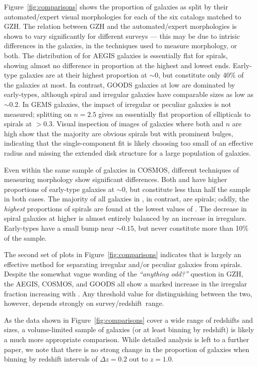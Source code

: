 \documentclass[twocolumn]{aastex6}
\begin{document}
Figure~\ref{fig:comparisons} shows the proportion of galaxies as split by their automated/expert visual morphologies for each of the six catalogs matched to GZH. The relation between GZH and the automated/expert morphologies is shown to vary significantly for different surveys --- this may be due to intrisic differences in the galaxies, in the techniques used to measure morphology, or both. The distribution of \pbest{} for AEGIS galaxies is essentially flat for spirals, showing almost no difference in proportion at the highest and lowest ends. Early-type galaxies are at their highest proportion at \pbest$\sim0$, but constitute only 40\% of the galaxies at most. In contrast, GOODS galaxies at low \pbest{} are dominated by early-types, although spiral and irregular galaxies have comparable sizes as low as \pbest$\sim0.2$. In GEMS galaxies, the impact of irregular or peculiar galaxies is not measured; splitting on $n=2.5$ gives an essentially flat proportion of ellipticals to spirals at \pbest$>0.3$. Visual inspection of images of galaxies where both \pbest{} and $n$ are high show that the majority are obvious spirals but with prominent bulges, indicating that the single-component \sersic{} fit is likely choosing too small of an effective radius and missing the extended disk structure for a large population of galaxies. 

Even within the same sample of galaxies in COSMOS, different techniques of measuring morphology show significant differences. Both \citet{cas07} and \citet{tas11} have higher proportions of early-type galaxies at \pbest$\sim0$, but constitute less than half the sample in both cases. The majority of all galaxies in \citet{sca07}, in contrast, are spirals; oddly, the \emph{highest} proportions of spirals are found at the lowest values of \pbest. The decrease in spiral galaxies at higher \pbest{} is almost entirely balanced by an increase in irregulars. Early-types have a small bump near \pbest$\sim0.15$, but never constitute more than 10\% of the sample. 

The second set of plots in Figure~\ref{fig:comparisons} indicates that \podd{} is largely an effective method for separating irregular and/or peculiar galaxies from spirals. Despite the somewhat vague wording of the {\it ``anything odd?''} question in GZH, the AEGIS, COSMOS, and GOODS all show a marked increase in the irregular fraction increasing with \podd. Any threshold value for distinguishing between the two, however, depends strongly on survey/redshift~range. 

As the data shown in Figure~\ref{fig:comparisons} cover a wide range of redshifts and sizes, a volume-limited sample of galaxies (or at least binning by redshift) is likely a much more appropriate comparison. While detailed analysis is left to a further paper, we note that there is no strong change in the proportion of galaxies when binning by redshift intervals of $\Delta z=0.2$ out to $z=1.0$. 
\end{document}
